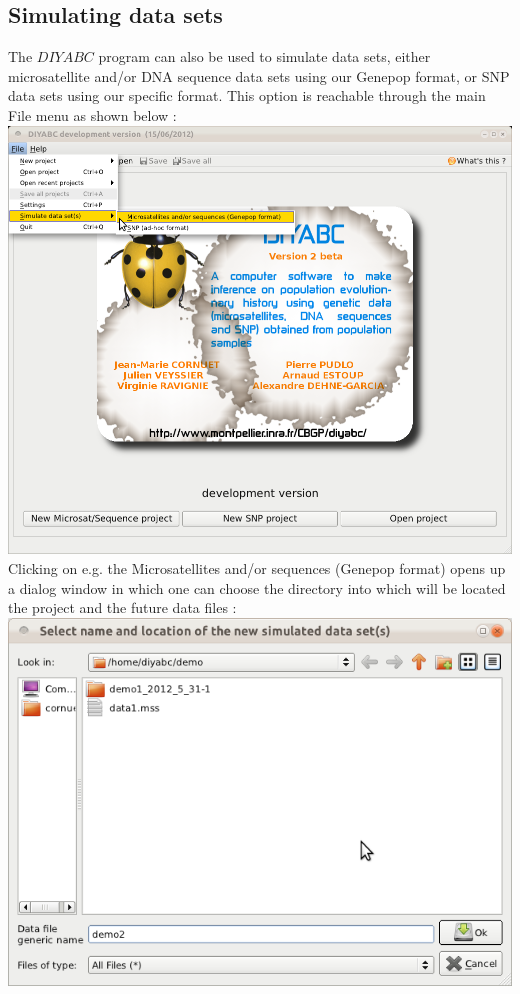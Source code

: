 \subsection{Simulating data sets}

The $DIYABC$ program can also be used to simulate data sets, either microsatellite and/or DNA sequence data sets using our Genepop format, or SNP data sets using our specific format. This option is reachable through the main \textsf{File} menu as shown below :\\

\includegraphics[scale=0.33]{gui_pictures/Capture-DIYABC-62.png} \\

Clicking on e.g. the \textsf{Microsatellites and/or sequences (Genepop format)} opens up a dialog window in which one can choose the directory into which will be located the project and the future data files :\\

\includegraphics[scale=0.33]{gui_pictures/Capture-DIYABC-64.png} \\


